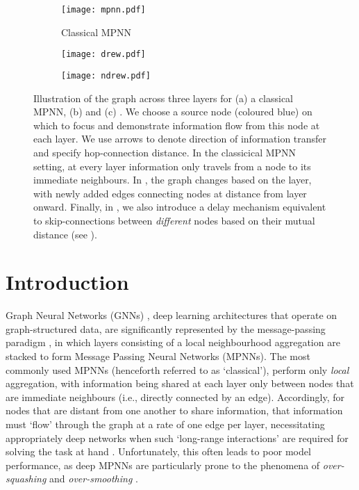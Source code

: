 \documentclass{article}
\theoremstyle{plain}
\theoremstyle{definition}
\theoremstyle{remark}
\begin{document}
\begin{figure*}[tb]
     \centering
     \begin{subfigure}[b]{0.33\textwidth}
         \centering
         \texttt{[image: mpnn.pdf]}
         \caption{Classical MPNN}
         \label{Fig:mpnn}
     \end{subfigure}
     \hfill
     \begin{subfigure}[b]{0.33\textwidth}
         \centering
         \texttt{[image: drew.pdf]}
         \caption{}
         \label{Fig:non-delay_mpnn}
     \end{subfigure}
     \hfill
     \begin{subfigure}[b]{0.33\textwidth}
         \centering
         \texttt{[image: ndrew.pdf]}
         \caption{}
         \label{fig:five over x}
     \end{subfigure}
        \caption{Illustration of the graph across three layers  for (a) a classical MPNN, (b)  and (c) . We choose a source node (coloured blue) on which to focus and demonstrate information flow from this node at each layer.
        We use arrows to denote direction of information transfer and specify hop-connection distance.
        In the classicical MPNN setting, at every layer information only travels from a node to its immediate neighbours. In , the graph changes based on the layer, with newly added edges connecting nodes at distance  from layer  onward. Finally, in , we also introduce a delay mechanism equivalent to skip-connections between {\em different} nodes based on their mutual distance (see ).}
        \label{Fig:delay_mpnn}
\end{figure*}

\section{Introduction}
\label{introduction}
Graph Neural Networks (GNNs) \citep{sperduti1994encoding, gori2005new, scarselli2008graph, bruna2013spectral}, deep learning architectures that operate on graph-structured data, are
significantly represented
by the message-passing paradigm \citep{gilmer2017neural}, in which layers  consisting of a local neighbourhood aggregation are stacked to form Message Passing Neural Networks (MPNNs). The most commonly used MPNNs (henceforth referred to as `classical'), perform only {\em local} aggregation, with information being shared at each layer only between nodes that are immediate neighbours (i.e.,  directly connected by an edge). Accordingly, for
nodes that are
distant from one another
to share information, that information must `flow' through the graph at a rate of one edge per layer, necessitating appropriately deep networks when such `long-range interactions' are required for solving the task at hand \citep{barcelo2019logical}. Unfortunately, this often leads to poor model performance, as deep MPNNs are particularly prone to the phenomena of \emph{over-squashing} \citep{alon2020bottleneck,topping2021understanding, di2023over} and \emph{over-smoothing} \citep{nt2019revisiting,Oono2019}.
\end{document}
